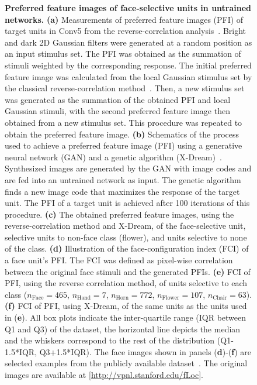 \documentclass[sn-mathphys]{sn-jnl}%
\theoremstyle{thmstyleone}%
\theoremstyle{thmstyletwo}%
\theoremstyle{thmstylethree}%
\begin{document}
\begin{figure}[htbp]
	
	\centering
	\caption{
		\textbf{Preferred feature images of face-selective units in untrained networks.
		}
		\textbf{(a)} Measurements of preferred feature images (PFI) of target units in Conv5 from the reverse-correlation analysis~\cite{bonin2011local}.
		Bright and dark 2D Gaussian filters were generated at a random position as an input stimulus set.
		The PFI was obtained as the summation of stimuli weighted by the corresponding response.
		The initial preferred feature image was calculated from the local Gaussian stimulus set by the classical reverse-correlation method~\cite{bonin2011local}.
		Then, a new stimulus set was generated as the summation of the obtained PFI and local Gaussian stimuli, with the second preferred feature image then obtained from a new stimulus set.
		This procedure was repeated to obtain the preferred feature image.
		\textbf{(b)} Schematics of the process used to achieve a preferred feature image (PFI) using a generative neural network (GAN) and a genetic algorithm (X-Dream)~\cite{ponce2019evolving}.
		Synthesized images are generated by the GAN with image codes and are fed into an untrained network as input.
		The genetic algorithm finds a new image code that maximizes the response of the target unit.
		The PFI of a target unit is achieved after 100 iterations of this procedure.
		\textbf{(c)} The obtained preferred feature images, using the reverse-correlation method and X-Dream, of the face-selective unit, selective units to non-face class (flower), and units selective to none of the class.
		\textbf{(d)} Illustration of the face-configuration index (FCI) of a face unit's PFI.
		The FCI was defined as pixel-wise correlation between the original face stimuli and the generated PFIs.
		\textbf{(e)} FCI of PFI, using the reverse correlation method, of units selective to each class ($ n_\textrm{Face} = 465 $, $ n_\textrm{Hand} = 7 $, $ n_\textrm{Horn} = 772 $, $ n_\textrm{Flower} = 107 $, $ n_\textrm{Chair} = 63 $).
		\textbf{(f)} FCI of PFI, using X-Dream, of the same units as the units used in (\textbf{e}).
		All box plots indicate the inter-quartile range (IQR between Q1 and Q3) of the dataset,
		the horizontal line depicts the median and the whiskers correspond to the rest of the distribution (Q1-1.5*IQR, Q3+1.5*IQR).
		The face images shown in panels (\textbf{d})-(\textbf{f}) are selected examples from the publicly available dataset~\cite{stigliani2015temporal}.
		The original images are available at [\url{http://vpnl.stanford.edu/fLoc}].
	}
	\label{fig:preferred}
\end{figure}
\end{document}
